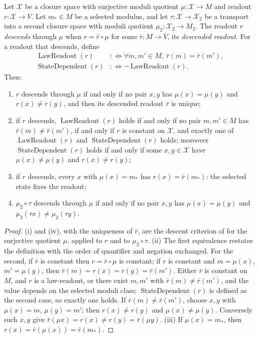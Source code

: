 \begin{theorem}\label{thm:F46}
Let \(\mathcal X\) be a closure space with surjective moduli quotient
\(\mu:\mathcal X\to M\) and readout \(r:\mathcal X\to V\). Let
\(m_\ast\in M\) be a selected modulus, and let
\(\tau:\mathcal X\to\mathcal X_2\) be a transport into a second closure
space with moduli quotient \(\mu_2:\mathcal X_2\to M_2\). The readout
\(r\) \emph{descends} through \(\mu\) when \(r=\bar r\circ\mu\) for some
\(\bar r:M\to V\), its \emph{descended readout}. For a readout that descends,
define
\begin{align*}
  \operatorname{LawReadout}(r)
  &:\Longleftrightarrow
  \forall m,m'\in M,\ \bar r(m)=\bar r(m'),\\
  \operatorname{StateDependent}(r)
  &:\Longleftrightarrow \neg\operatorname{LawReadout}(r).
\end{align*}
Then:
\begin{enumerate}[label=(\roman*)]
\item \(r\) descends through \(\mu\) if and only if no pair \(x,y\) has
  \(\mu(x)=\mu(y)\) and \(r(x)\ne r(y)\), and then its descended readout
  \(\bar r\) is unique;
\item if \(r\) descends, \(\operatorname{LawReadout}(r)\) holds if and only if no
  pair \(m,m'\in M\) has \(\bar r(m)\ne\bar r(m')\), if and only if \(r\) is
  constant on \(\mathcal X\), and exactly one of
  \(\operatorname{LawReadout}(r)\) and \(\operatorname{StateDependent}(r)\)
  holds; moreover \(\operatorname{StateDependent}(r)\) holds if and only if
  some \(x,y\in\mathcal X\) have \(\mu(x)\ne\mu(y)\) and \(r(x)\ne r(y)\);
\item if \(r\) descends, every \(x\) with \(\mu(x)=m_\ast\) has
  \(r(x)=\bar r(m_\ast)\): the selected state fixes the readout;
\item \(\mu_2\circ\tau\) descends through \(\mu\) if and only if no pair
  \(x,y\) has \(\mu(x)=\mu(y)\) and \(\mu_2(\tau x)\ne\mu_2(\tau y)\).
\end{enumerate}
\end{theorem}
\begin{proof}
(i) and (iv), with the uniqueness of \(\bar r\), are the descent
criterion of  for the surjective quotient \(\mu\),
applied to \(r\) and to \(\mu_2\circ\tau\). (ii) The first equivalence restates
the definition with the order of quantifier and negation exchanged. For the
second, if \(\bar r\) is constant then \(r=\bar r\circ\mu\) is constant; if
\(r\) is constant and \(m=\mu(x)\), \(m'=\mu(y)\), then
\(\bar r(m)=r(x)=r(y)=\bar r(m')\). Either \(\bar r\) is constant on \(M\), and
\(r\) is a law-readout, or there exist \(m,m'\) with
\(\bar r(m)\ne\bar r(m')\), and the value depends on the selected moduli
class; \(\operatorname{StateDependent}(r)\) is defined as the second case, so
exactly one holds. If \(\bar r(m)\ne\bar r(m')\), choose \(x,y\) with
\(\mu(x)=m\), \(\mu(y)=m'\); then \(r(x)\ne r(y)\) and \(\mu(x)\ne\mu(y)\).
Conversely such \(x,y\) give \(\bar r(\mu x)=r(x)\ne r(y)=\bar r(\mu y)\). (iii) If \(\mu(x)=m_\ast\), then
\(r(x)=\bar r(\mu(x))=\bar r(m_\ast)\).
\end{proof}

